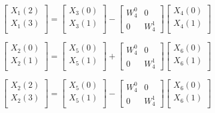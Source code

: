 \documentclass[journal,12pt,twocolumn]{IEEEtran}
\renewcommand\thesection{\arabic{section}}
\begin{document}
\begin{enumerate}[label=\arabic*.,ref=\thesection.\theenumi]
\begin{equation}
\begin{bmatrix}
X_{1}(2) \\ 
X_{1}(3)\\ 
\end{bmatrix}
=
\begin{bmatrix}
X_{3}(0) \\ 
X_{3}(1)\\ 
\end{bmatrix}
-
\begin{bmatrix}
W^{0}_{4} & 0\\
0 & W^{1}_{4}
\end{bmatrix}
\begin{bmatrix}
X_{4}(0) \\ 
X_{4}(1) \\ 
\end{bmatrix}
\end{equation}

\begin{equation}
\begin{bmatrix}
X_{2}(0) \\ 
X_{2}(1)\\ 
\end{bmatrix}
=
\begin{bmatrix}
X_{5}(0) \\ 
X_{5}(1)\\ 
\end{bmatrix}
+
\begin{bmatrix}
W^{0}_{4} & 0\\
0 & W^{1}_{4}
\end{bmatrix}
\begin{bmatrix}
X_{6}(0) \\ 
X_{6}(1) \\ 
\end{bmatrix}
\end{equation}

\begin{equation}
\begin{bmatrix}
X_{2}(2) \\ 
X_{2}(3)\\ 
\end{bmatrix}
=
\begin{bmatrix}
X_{5}(0) \\ 
X_{5}(1)\\ 
\end{bmatrix}
-
\begin{bmatrix}
W^{0}_{4} & 0\\
0 & W^{1}_{4}
\end{bmatrix}
\begin{bmatrix}
X_{6}(0) \\ 
X_{6}(1) \\ 
\end{bmatrix}
\end{equation}


\end{enumerate}
\end{document}

